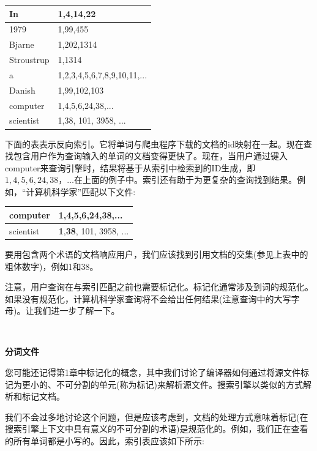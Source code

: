 \begin{table}[h]
	\begin{tabularx}{\textwidth}{|X|X|}
		\hline
		In & 1,4,14,22 \\
		\hline
		1979 & 1,99,455 \\
		\hline
		Bjarne & 1,202,1314 \\
		\hline
		Stroustrup & 1,1314 \\
		\hline
		a & 1,2,3,4,5,6,7,8,9,10,11,... \\
		\hline
		Danish & 1,99,102,103 \\
		\hline
		computer & 1,4,5,6,24,38,... \\
		\hline
		scientist & 1,38, 101, 3958, ... \\
		\hline
	\end{tabularx}
\end{table}

下面的表表示反向索引。它将单词与爬虫程序下载的文档的id映射在一起。现在查找包含用户作为查询输入的单词的文档变得更快了。现在，当用户通过键入computer来查询引擎时，结果将基于从索引中检索到的ID生成，即$ 1,4,5,6,24,38，… $在上面的例子中。索引还有助于为更复杂的查询找到结果。例如，“计算机科学家”匹配以下文件: \par

\begin{table}[h]
	\begin{tabularx}{\textwidth}{|X|X|}
		\hline
		computer & \textbf{1},4,5,6,24,\textbf{38},... \\
		\hline
		scientist & \textbf{1},\textbf{38}, 101, 3958, ... \\
		\hline
	\end{tabularx}
\end{table}

要用包含两个术语的文档响应用户，我们应该找到引用文档的交集(参见上表中的粗体数字)，例如1和38。 \par
注意，用户查询在与索引匹配之前也需要标记化。标记化通常涉及到词的规范化。如果没有规范化，计算机科学家查询将不会给出任何结果(注意查询中的大写字母)。让我们进一步了解一下。 \par

\noindent\textbf{}\ \par
\textbf{分词文件} \ \par
您可能还记得第1章中标记化的概念，其中我们讨论了编译器如何通过将源文件标记为更小的、不可分割的单元(称为标记)来解析源文件。搜索引擎以类似的方式解析和标记文档。 \par
我们不会过多地讨论这个问题，但是应该考虑到，文档的处理方式意味着标记(在搜索引擎上下文中具有意义的不可分割的术语)是规范化的。例如，我们正在查看的所有单词都是小写的。因此，索引表应该如下所示: \par

